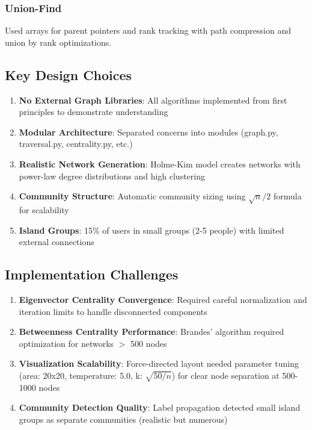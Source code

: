 \documentclass[12pt,a4paper]{article}
\begin{document}
\subsubsection{Union-Find}
Used arrays for parent pointers and rank tracking with path compression and union by rank optimizations.

\subsection{Key Design Choices}

\begin{enumerate}
    \item \textbf{No External Graph Libraries}: All algorithms implemented from first principles to demonstrate understanding
    \item \textbf{Modular Architecture}: Separated concerns into modules (graph.py, traversal.py, centrality.py, etc.)
    \item \textbf{Realistic Network Generation}: Holme-Kim model creates networks with power-law degree distributions and high clustering
    \item \textbf{Community Structure}: Automatic community sizing using $\sqrt{n}/2$ formula for scalability
    \item \textbf{Island Groups}: 15\% of users in small groups (2-5 people) with limited external connections
\end{enumerate}

\subsection{Implementation Challenges}

\begin{enumerate}
    \item \textbf{Eigenvector Centrality Convergence}: Required careful normalization and iteration limits to handle disconnected components
    \item \textbf{Betweenness Centrality Performance}: Brandes' algorithm required optimization for networks $>$ 500 nodes
    \item \textbf{Visualization Scalability}: Force-directed layout needed parameter tuning (area: 20x20, temperature: 5.0, k: $\sqrt{50/n}$) for clear node separation at 500-1000 nodes
    \item \textbf{Community Detection Quality}: Label propagation detected small island groups as separate communities (realistic but numerous)
\end{enumerate}
\end{document}
